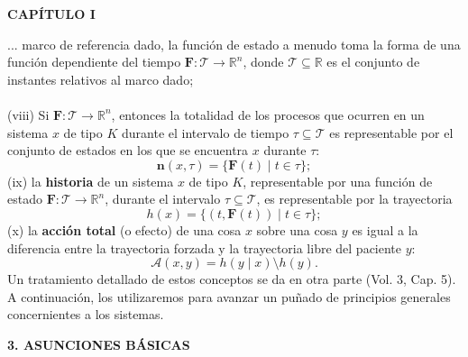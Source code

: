 \newpage
\fancyhf{}
\fancyhead[l]{\thepage}
\begin{center}
{\fontsize{13}{16}\selectfont \textbf{CAPÍTULO I}}
\end{center}
\vspace{0.5cm}

{\fontsize{13}{15}\selectfont
... marco de referencia dado, la función de estado a menudo toma la forma de una función dependiente del tiempo $\mathbf{F}: \mathcal{T} \rightarrow \mathbb{R}^n$, donde $\mathcal{T} \subseteq \mathbb{R}$ es el conjunto de instantes relativos al marco dado;
\\\\
(viii) Si $\mathbf{F}: \mathcal{T} \rightarrow \mathbb{R}^n$, entonces la totalidad de los procesos que ocurren en un sistema $x$ de tipo $K$ durante el intervalo de tiempo $\tau \subseteq \mathcal{T}$ es representable por el conjunto de estados en los que se encuentra $x$ durante $\tau$:
$$ \mathbf{n}(x, \tau) = \{\mathbf{F}(t) \mid t \in \tau\}; $$
(ix) la \textbf{historia} de un sistema $x$ de tipo $K$, representable por una función de estado $\mathbf{F}: \mathcal{T} \rightarrow \mathbb{R}^n$, durante el intervalo $\tau \subseteq \mathcal{T}$, es representable por la trayectoria
$$ h(x) = \{(t, \mathbf{F}(t)) \mid t \in \tau\}; $$
(x) la \textbf{acción total} (o efecto) de una cosa $x$ sobre una cosa $y$ es igual a la diferencia entre la trayectoria forzada y la trayectoria libre del paciente $y$:
$$ \mathcal{A}(x, y) = h(y \mid x) \setminus h(y). $$
Un tratamiento detallado de estos conceptos se da en otra parte (Vol. 3, Cap. 5). A continuación, los utilizaremos para avanzar un puñado de principios generales concernientes a los sistemas.

\begin{center}
{\fontsize{13}{16}\selectfont \textbf{3. ASUNCIONES BÁSICAS}}
\end{center}

}
